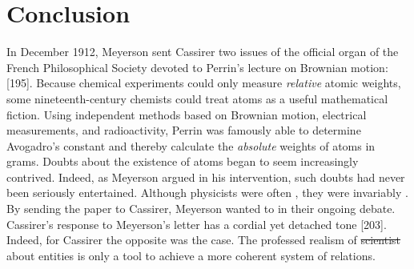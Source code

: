 \documentclass[submitted,12pt]{article}
\providecommand{\DIFadd}[1]{{\protect\color{blue}\uwave{#1}}} %
\providecommand{\DIFdel}[1]{{\protect\color{red}\sout{#1}}}                      %
\providecommand{\DIFaddbegin}{} %
\providecommand{\DIFaddend}{} %
\providecommand{\DIFdelbegin}{} %
\providecommand{\DIFdelend}{} %
\begin{document}
\section*{Conclusion}
%
In December 1912, Meyerson sent Cassirer two issues of the official organ of the French Philosophical Society devoted to Perrin’s lecture on Brownian motion:  [195]. Because chemical experiments could only measure \emph{relative} atomic weights, some nineteenth-century chemists could treat atoms as a useful mathematical fiction. Using independent methods based on Brownian motion, electrical measurements, and radioactivity, Perrin was famously able to determine Avogadro's constant \citep[281]{Perrin1910} and thereby calculate the \emph{absolute} weights of atoms in grams. Doubts about the existence of atoms began to seem increasingly contrived. Indeed, as Meyerson argued in his intervention, such doubts had never been seriously entertained. Although physicists were often , they were invariably .  By sending the paper to Cassirer, Meyerson wanted to  in their ongoing debate. Cassirer’s response to Meyerson’s letter has a cordial yet detached tone [203]. Indeed, for Cassirer the opposite was the case. The professed realism of \DIFdelbegin \DIFdel{scientist }\DIFdelend \DIFaddbegin \DIFadd{scientists }\DIFaddend about  entities is only a tool to achieve a more coherent system of  relations.

\end{document}

